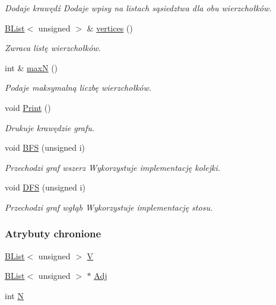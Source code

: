 \begin{DoxyCompactItemize}
\begin{DoxyCompactList}\small\item\em Dodaje krawędź Dodaje wpisy na listach sąsiedztwa dla obu wierzchołków. \end{DoxyCompactList}\item 
\hyperlink{class_b_list}{B\-List}$<$ unsigned $>$ \& \hyperlink{class_graph_afa24fcfb647f26c4685749cb2415f65d}{vertices} ()
\begin{DoxyCompactList}\small\item\em Zwraca listę wierzchołków. \end{DoxyCompactList}\item 
int \& \hyperlink{class_graph_a8964ae826a9323ec3fd565dd3a90be24}{max\-N} ()
\begin{DoxyCompactList}\small\item\em Podaje maksymalną liczbę wierzchołków. \end{DoxyCompactList}\item 
void \hyperlink{class_graph_a8401c9a52f79166e118653cb40416764}{Print} ()
\begin{DoxyCompactList}\small\item\em Drukuje krawędzie grafu. \end{DoxyCompactList}\item 
void \hyperlink{class_graph_a8cc0bbeb0a745a071bf9f8caa4822889}{B\-F\-S} (unsigned i)
\begin{DoxyCompactList}\small\item\em Przechodzi graf wszerz Wykorzystuje implementację kolejki. \end{DoxyCompactList}\item 
void \hyperlink{class_graph_a799822f4b278f1ef2024a4d26a3c1c93}{D\-F\-S} (unsigned i)
\begin{DoxyCompactList}\small\item\em Przechodzi graf wgłąb Wykorzystuje implementację stosu. \end{DoxyCompactList}\end{DoxyCompactItemize}
\subsubsection*{Atrybuty chronione}
\begin{DoxyCompactItemize}
\item 
\hyperlink{class_b_list}{B\-List}$<$ unsigned $>$ \hyperlink{class_graph_ab2e9947e838cf65a60dfa3ec57367c45}{V}
\item 
\hyperlink{class_b_list}{B\-List}$<$ unsigned $>$ $\ast$ \hyperlink{class_graph_a666d457e13e81f8101235eb28f7f9d5a}{Adj}
\item 
int \hyperlink{class_graph_ae9cf5ba4841d02a2746033b68bd38764}{N}
\end{DoxyCompactItemize}


